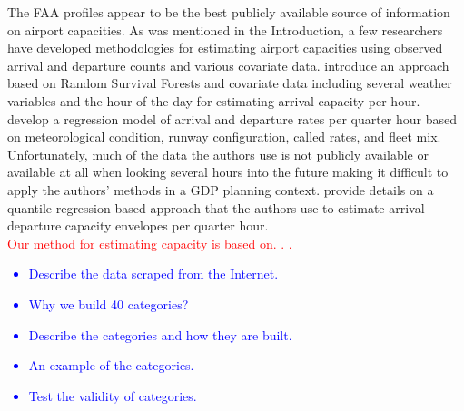 \documentclass[12pt]{article}
\begin{document}
	\newline
	The FAA profiles appear to be the best publicly available source of information on airport capacities.  As was mentioned in the Introduction, a few researchers have developed methodologies for estimating airport capacities using observed arrival and departure counts and various covariate data.  \cite{gorripaty} introduce an approach based on Random Survival Forests and covariate data including several weather variables and the hour of the day for estimating arrival capacity per hour.  \cite{kim} develop a regression model of arrival and departure rates per quarter hour based on meteorological condition, runway configuration, called rates, and fleet mix.  Unfortunately, much of the data the authors use is not publicly available or available at all when looking several hours into the future making it difficult to apply the authors' methods in a GDP planning context.  \cite{ramnujam} provide details on a quantile regression based approach that the authors use to estimate arrival-departure capacity envelopes per quarter hour.\\
	\newline
	\textcolor{red}{Our method for estimating capacity is based on. . . }
	\textcolor{blue}{
	\begin{itemize}
			\item Describe the data scraped from the Internet.
			\item Why we build 40 categories?
			\item Describe the categories and how they are built.
			\item An example of the categories.
			\item Test the validity of categories.
	\end{itemize}}
\end{document}
